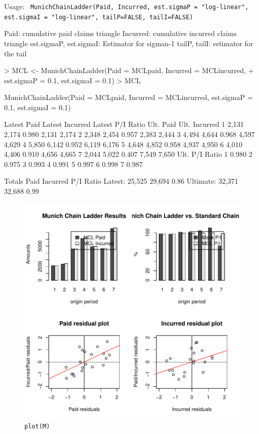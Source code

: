 \documentclass[a4paper]{article}
\begin{document}
Usage:
\texttt{
MunichChainLadder(Paid, Incurred,
      est.sigmaP = "log-linear",
      est.sigmaI = "log-linear",
      tailP=FALSE, tailI=FALSE)
}

Paid: cumulative paid claims triangle
Incurred: cumulative incurred claims triangle
est.sigmaP, est.sigmaI: Estimator for sigman-1
tailP, tailI: estimator for the tail
\begin{Schunk}
\begin{Sinput}
> MCL <- MunichChainLadder(Paid = MCLpaid, Incurred = MCLincurred, 
+     est.sigmaP = 0.1, est.sigmaI = 0.1)
> MCL
\end{Sinput}
\begin{Soutput}
MunichChainLadder(Paid = MCLpaid, Incurred = MCLincurred, est.sigmaP = 0.1, 
    est.sigmaI = 0.1)

  Latest Paid Latest Incurred Latest P/I Ratio Ult. Paid Ult. Incurred
1       2,131           2,174            0.980     2,131         2,174
2       2,348           2,454            0.957     2,383         2,444
3       4,494           4,644            0.968     4,597         4,629
4       5,850           6,142            0.952     6,119         6,176
5       4,648           4,852            0.958     4,937         4,950
6       4,010           4,406            0.910     4,656         4,665
7       2,044           5,022            0.407     7,549         7,650
  Ult. P/I Ratio
1          0.980
2          0.975
3          0.993
4          0.991
5          0.997
6          0.998
7          0.987

Totals
            Paid Incurred P/I Ratio
Latest:   25,525   29,694      0.86
Ultimate: 32,371   32,688      0.99
\end{Soutput}
\end{Schunk}
\begin{figure}[h]
  \begin{center}
\includegraphics{ChainLadder-016}
    \caption{\texttt{plot(M)}}
  \end{center}
\end{figure}
\end{document}
